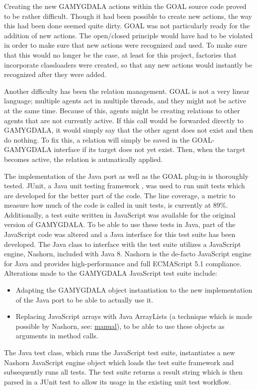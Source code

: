 Creating the new GAMYGDALA actions within the GOAL source code proved to be rather difficult. Though it had been possible to create new actions, the way this had been done seemed quite dirty. GOAL was not particularly ready for the addition of new actions. The open/closed principle would have had to be violated in order to make sure that new actions were recognized and used. To make sure that this would no longer be the case, at least for this project, factories that incorporate classloaders were created, so that any new actions would instantly be recognized after they were added.

Another difficulty has been the relation management. GOAL is not a very linear language; multiple agents act in multiple threads, and they might not be active at the same time. Because of this, agents might be creating relations to other agents that are not currently active. If this call would be forwarded directly to GAMYGDALA, it would simply say that the other agent does not exist and then do nothing. To fix this, a relation will simply be saved in the GOAL-GAMYGDALA interface if its target does not yet exist. Then, when the target becomes active, the relation is autmatically applied.

The implementation of the Java port as well as the GOAL plug-in is thoroughly tested. JUnit, a Java unit testing framework \citep{junit}, was used to run unit tests which are developed for the better part of the code. The line coverage, a metric to measure how much of the code is called in unit tests, is currently at 89\%. Additionally, a test suite written in JavaScript was available for the original version of GAMYGDALA. To be able to use these tests in Java, part of the JavaScript code was altered and a Java interface for this test suite has been developed. The Java class to interface with the test suite utilizes a JavaScript engine, Nashorn, included with Java 8. Nashorn is the de-facto JavaScript engine for Java and provides high-performance \citep{projnashorn} and full ECMAScript 5.1 compliance. Alterations made to the GAMYGDALA JavaScript test suite include:
\begin{itemize}
\item Adapting the GAMYGDALA object instantiation to the new implementation of the Java port to be able to actually use it.
\item Replacing JavaScript arrays with Java ArrayLists (a technique which is made possible by Nashorn, see: \href{http://docs.oracle.com/javase/8/docs/technotes/guides/scripting/prog_guide/javascript.html#A1147187}{manual}), to be able to use these objects as arguments in method calls.
\end{itemize}
The Java test class, which runs the JavaScript test suite, instantiates a new Nashorn JavaScript engine object which loads the test suite framework and subsequently runs all tests. The test suite returns a result string which is then parsed in a JUnit test to allow its usage in the existing unit test workflow.

